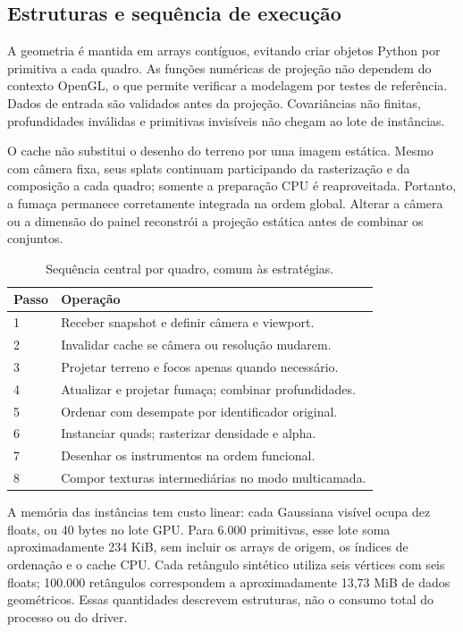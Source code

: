 \documentclass[conference]{IEEEtran}
\begin{document}
\subsection{Estruturas e sequência de execução}
A geometria é mantida em arrays contíguos, evitando criar objetos Python por primitiva a cada quadro. As funções numéricas de projeção não dependem do contexto OpenGL, o que permite verificar a modelagem por testes de referência. Dados de entrada são validados antes da projeção. Covariâncias não finitas, profundidades inválidas e primitivas invisíveis não chegam ao lote de instâncias.

O cache não substitui o desenho do terreno por uma imagem estática. Mesmo com câmera fixa, seus splats continuam participando da rasterização e da composição a cada quadro; somente a preparação CPU é reaproveitada. Portanto, a fumaça permanece corretamente integrada na ordem global. Alterar a câmera ou a dimensão do painel reconstrói a projeção estática antes de combinar os conjuntos.

\begin{table}[t]
\centering
\caption{Sequência central por quadro, comum às estratégias.}
\begin{tabular}{lp{6.9cm}}
\toprule
Passo & Operação\\
\midrule
1 & Receber snapshot e definir câmera e viewport.\\
2 & Invalidar cache se câmera ou resolução mudarem.\\
3 & Projetar terreno e focos apenas quando necessário.\\
4 & Atualizar e projetar fumaça; combinar profundidades.\\
5 & Ordenar com desempate por identificador original.\\
6 & Instanciar quads; rasterizar densidade e alpha.\\
7 & Desenhar os instrumentos na ordem funcional.\\
8 & Compor texturas intermediárias no modo multicamada.\\
\bottomrule
\end{tabular}
\end{table}

A memória das instâncias tem custo linear: cada Gaussiana visível ocupa dez floats, ou 40 bytes no lote GPU. Para 6.000 primitivas, esse lote soma aproximadamente 234 KiB, sem incluir os arrays de origem, os índices de ordenação e o cache CPU. Cada retângulo sintético utiliza seis vértices com seis floats; 100.000 retângulos correspondem a aproximadamente 13,73 MiB de dados geométricos. Essas quantidades descrevem estruturas, não o consumo total do processo ou do driver.
\end{document}
